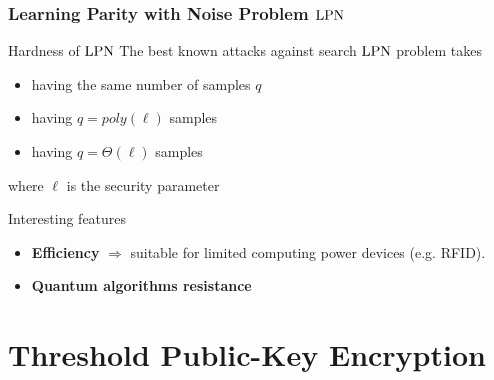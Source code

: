 \begin{frame}
 \frametitle{Learning Parity with Noise Problem $\mathrm{LPN}$}

  \begin{block}{Hardness of $\mathrm{LPN}$}
  The best known attacks against search $\mathrm{LPN}$ problem takes
  



   \begin{itemize}[<+->]
    \item {} having the same number of samples $q$
    \item {} having $q=poly(\ell)$ samples
    \item {} having $q= \mathcal{\varTheta}(\ell)$ samples
   \end{itemize} 
where $\ell$ is the security parameter
  \end{block}
  
  \begin{block}{Interesting features}
    \begin{itemize}
      \item<4-> \textbf{Efficiency} $\Rightarrow$ suitable for limited computing power devices (e.g. RFID).
      \item<5-> \textbf{Quantum algorithms resistance}
    \end{itemize}
  \end{block}

\end{frame}

\section{Threshold Public-Key Encryption}

